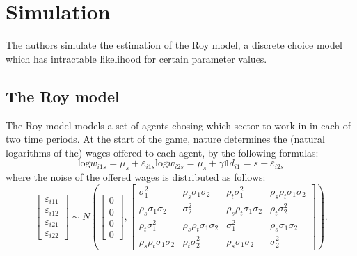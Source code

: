 \section{Simulation}
\label{sec:simulation}

The authors simulate the estimation of the Roy model, a discrete choice model which has intractable likelihood for certain parameter values.

\subsection{The Roy model}
\label{sec:roy}

The Roy model models a set of agents chosing which sector to work in in each of two time periods.
At the start of the game, nature determines the (natural logarithms of the) wages offered to each agent, by the following formulas:
\begin{equation} %
    \text{log} w_{i1s} = \mu_s + \varepsilon_{i1s}
    \text{log} w_{i2s} = \mu_s + \gamma \mathbb{1} {d_{i1} = s} + \varepsilon_{i2s} %
\end{equation}
where the noise of the offered wages is distributed as follows:
\begin{equation}
    \left[\begin{array}{l}\varepsilon_{i 11} \\ \varepsilon_{i 12} \\ \varepsilon_{i 21} \\ \varepsilon_{i 22}\end{array}\right] \sim N\left(\left[\begin{array}{l}0 \\ 0 \\ 0 \\ 0\end{array}\right],\left[\begin{array}{cccc}\sigma_1^2 & \rho_s \sigma_1 \sigma_2 & \rho_t \sigma_1^2 & \rho_s \rho_t \sigma_1 \sigma_2 \\ \rho_s \sigma_1 \sigma_2 & \sigma_2^2 & \rho_s \rho_t \sigma_1 \sigma_2 & \rho_t \sigma_2^2 \\ \rho_t \sigma_1^2 & \rho_s \rho_t \sigma_1 \sigma_2 & \sigma_1^2 & \rho_s \sigma_1 \sigma_2 \\ \rho_s \rho_t \sigma_1 \sigma_2 & \rho_t \sigma_2^2 & \rho_s \sigma_1 \sigma_2 & \sigma_2^2\end{array}\right]\right).
\end{equation}

